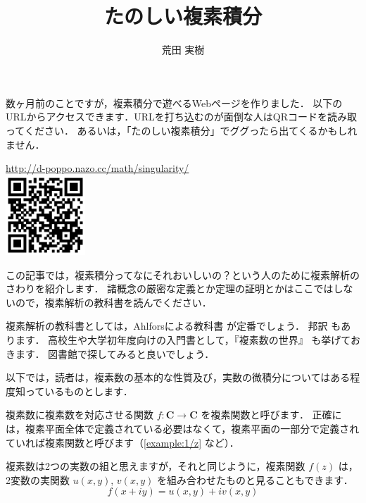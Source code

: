 \documentclass{ltjsarticle}
\title{たのしい複素積分}
\author{荒田 実樹}
\newcommand{\Complex}{\mathbf{C}}
\newcommand{\ImagI}{i}%
\theoremstyle{definition}
\theoremstyle{remark}
\begin{document}



数ヶ月前のことですが，複素積分で遊べるWebページを作りました．
以下のURLからアクセスできます．URLを打ち込むのが面倒な人はQRコードを読み取ってください．
あるいは，「たのしい複素積分」でググったら出てくるかもしれません．

\begin{center}
\url{http://d-poppo.nazo.cc/math/singularity/} \\
\includegraphics[width=3cm]{arata-qrcode.eps}
\end{center}

この記事では，複素積分ってなにそれおいしいの？という人のために複素解析のさわりを紹介します．
諸概念の厳密な定義とか定理の証明とかはここではしないので，複素解析の教科書を読んでください．

複素解析の教科書としては，Ahlforsによる教科書\cite{Ahlfors} が定番でしょう．
邦訳\cite{Ahlfors-ja} もあります．
高校生や大学初年度向けの入門書として，『複素数の世界』\cite{Ueno} も挙げておきます．
図書館で探してみると良いでしょう．

以下では，読者は，複素数の基本的な性質及び，実数の微積分についてはある程度知っているものとします．

\newcommand{\exampleautorefname}{例}

複素数に複素数を対応させる関数 $f\colon\Complex\to\Complex$ を複素関数と呼びます．
正確には，複素平面全体で定義されている必要はなくて，複素平面の一部分で定義されていれば複素関数と呼びます（\autoref{example:1/z} など）．

複素数は2つの実数の組と思えますが，それと同じように，複素関数 $f(z)$ は，2変数の実関数 $u(x,y)$, $v(x,y)$ を組み合わせたものと見ることもできます．
\[f(x+\ImagI y)=u(x,y)+\ImagI v(x,y)\]

\end{document}
